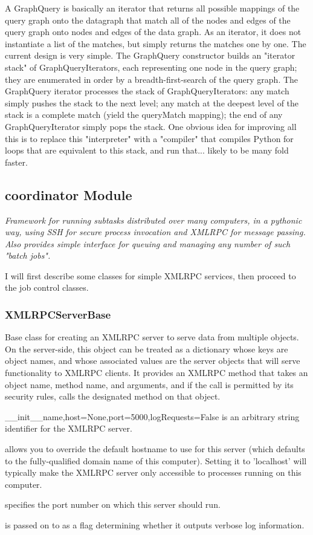 \documentclass{howto}
\begin{document}
A GraphQuery is basically an iterator that returns all possible mappings of the query graph onto the datagraph that match all of the nodes and edges of the query graph onto nodes and edges of the data graph.  As an iterator, it does not instantiate a list of the matches, but simply returns the matches one by one.  The current design is very simple.  The GraphQuery constructor builds an "iterator stack" of GraphQueryIterators, each representing one node in the query graph; they are enumerated in order by a breadth-first-search of the query graph.  The GraphQuery iterator processes the stack of GraphQueryIterators: any match simply pushes the stack to the next level; any match at the deepest level of the stack is a complete match (yield the queryMatch mapping); the end of any GraphQueryIterator simply pops the stack.  One obvious idea for improving all this is to replace this "interpreter" with a "compiler" that compiles Python for loops that are equivalent to this stack, and run that... likely to be many fold faster.






\subsection{coordinator Module}
\label{coord-module}

{\em Framework for running subtasks distributed over many computers, in a pythonic way, using SSH for secure process invocation and XMLRPC for message passing. Also provides simple interface for queuing and managing any number of such "batch jobs".}

I will first describe some classes for simple XMLRPC services, then proceed
to the job control classes.

\subsubsection{XMLRPCServerBase}
Base class for creating an XMLRPC server to serve data from multiple objects.
On the server-side, this object can be treated as a dictionary whose
keys are object names, and whose associated values are the server
objects that will serve functionality to XMLRPC clients.
It provides an XMLRPC method  that takes an object name,
method name, and arguments, and if the call is permitted by its security
rules, calls the designated method on that object.
\begin{funcdesc}{__init__}{name,host=None,port=5000,logRequests=False}
   is an arbitrary string identifier for the XMLRPC server.

   allows you to override the default hostname to use for this
  server (which defaults to the fully-qualified domain name of this computer).
  Setting it to 'localhost' will typically make the XMLRPC server only accessible
  to processes running on this computer.

   specifies the port number on which this server should run.

   is passed on to  as
  a flag determining whether it outputs verbose log information.
\end{funcdesc}
\end{document}
